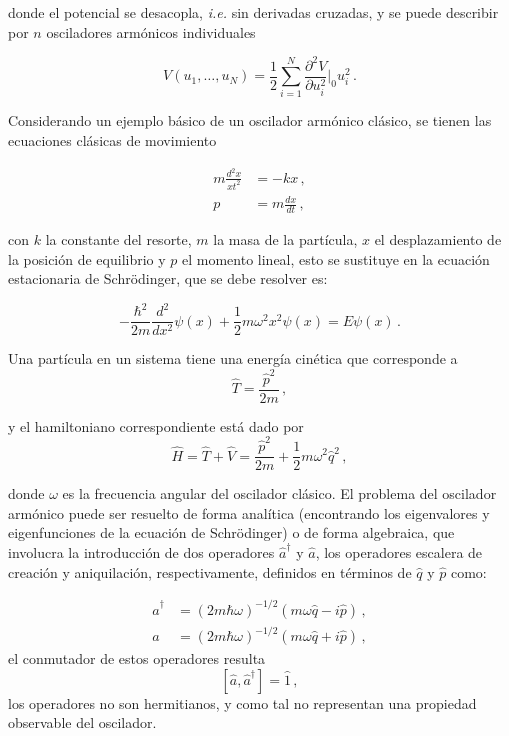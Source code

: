 donde el potencial se desacopla, \textit{i.e.} sin derivadas cruzadas, y se puede describir por $n$ osciladores armónicos individuales

\begin{equation*}
  V(u_1, \dots, u_N) = \frac{1}{2} \sum_{i=1}^{N} \frac{\partial^2 V}{\partial u_i^{2}}\Big|_0 u_i^2\,.
\end{equation*}

Considerando un ejemplo básico de un oscilador armónico clásico, se tienen las ecuaciones clásicas de movimiento

\begin{align}
  m \frac{d^2x}{xt^2} & = -kx \,, \label{OA.2}            \\
  p                   & = m\frac{dx}{dt} \,, \label{OA.3}
\end{align}

con $k$ la constante del resorte, $m$ la masa de la partícula, $x$ el desplazamiento de la posición de equilibrio y $p$ el momento lineal, esto se sustituye en la ecuación estacionaria de Schrödinger, que se debe resolver es:

\begin{equation}
  \label{OA.4}
  -\frac{\hbar^2}{2m}\frac{d^2}{dx^2}\psi(x) + \frac{1}{2}m \omega^2 x^2 \psi(x) = E \psi(x) \,.
\end{equation}

Una partícula en un sistema tiene una energía cinética que corresponde a
\begin{equation*}
  \hat{T} = \frac{\hat{p}^2}{2m}\,,
\end{equation*}

y el hamiltoniano correspondiente está dado por
\begin{equation}
  \hat{H} = \hat{T} + \hat{V} = \frac{\hat{p}^2}{2m} +\frac{1}{2} m\omega^2 \hat{q}^2 \label{OA.5}\,,
\end{equation}


donde $\omega$ es la frecuencia angular del oscilador clásico.
El problema del oscilador armónico puede ser resuelto de forma analítica (encontrando los eigenvalores y eigenfunciones de la ecuación de Schrödinger) o de forma algebraica, que involucra la introducción de dos operadores $\hat{a}^{\dagger}$ y $\hat{a}$, los operadores escalera de creación y aniquilación, respectivamente, definidos en términos de $\hat{q}$ y $\hat{p}$ como:

\begin{align}
  \hat{a}^{\dagger} & = (2m\hbar\omega)^{-1/2}(m\omega \hat{q} - i\hat{p})\label{OA.6} \,,   \\
  \hat{a}           & = (2m\hbar \omega)^{-1/2}(m\omega \hat{q} + i \hat{p})\label{OA.7} \,,
\end{align}
el conmutador de estos operadores resulta
\begin{equation}
  \label{OA.8}
  [\hat{a}, \hat{a}^{\dagger}] = \hat{1} \,,
\end{equation}
los operadores no son hermitianos, y como tal no representan una propiedad observable del oscilador. %

